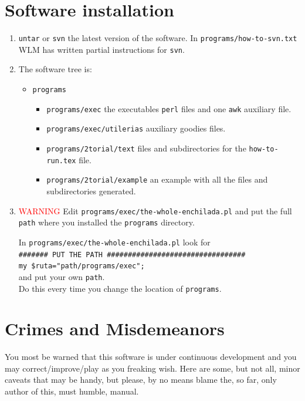 \documentclass[preprint,12pt]{revtex4}
\begin{document}
\section{Software installation}
\begin{enumerate}

\item \verb=untar= or \verb=svn= the latest version of the software.
In \verb=programs/how-to-svn.txt= WLM has written partial instructions
for \verb=svn=.
\item The software tree is:
\begin{itemize}
\item \verb=programs=
\begin{itemize}
\item \verb=programs/exec= the executables \verb=perl= files and one
  \verb=awk= auxiliary file.
\item \verb=programs/exec/utilerias= auxiliary goodies files. 
\item \verb=programs/2torial/text= files and subdirectories for the \verb=how-to-run.tex=
  file. 
\item \verb=programs/2torial/example= an example with all the files and subdirectories
  generated.
 
\end{itemize}
\end{itemize}
\item \textcolor{red}{WARNING} Edit
\verb=programs/exec/the-whole-enchilada.pl=  
and put the full \verb=path=
where you installed the \verb=programs= directory.

In
\verb=programs/exec/the-whole-enchilada.pl= 
look for \\
\verb=####### PUT THE PATH #################################=\\
\Verb+my $ruta="path/programs/exec";+\\
and put your own 
\verb=path=.\\
 Do this every time
you change the location of \verb=programs=. 
\end{enumerate}

\section{Crimes and Misdemeanors}

You most be warned that this software is under continuous development
and you may correct/improve/play as you freaking wish. Here are some,
but not all, minor caveats that may be handy, but please, by no means
blame the, so far, only author of this, must humble, manual.
\end{document}
